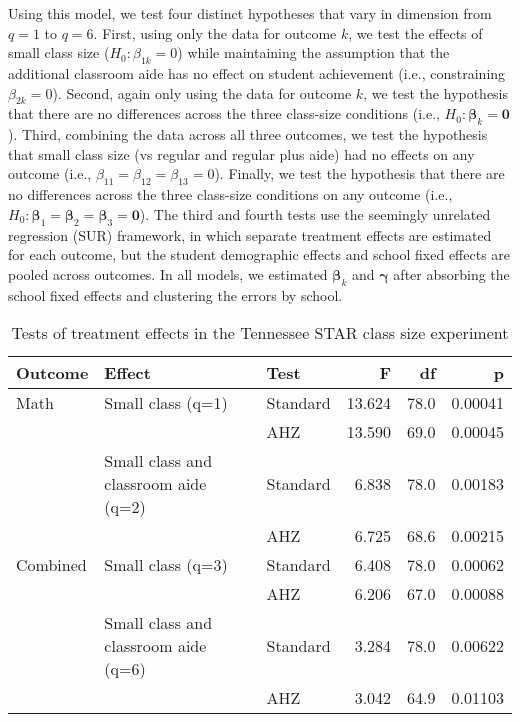 \documentclass[12pt]{article}\usepackage[]{graphicx}\usepackage[]{color}
\newcommand{\bm}{\mathbf}
\newcommand{\bs}{\boldsymbol}
\begin{document}
Using this model, we test four distinct hypotheses that vary in dimension from $q = 1$ to $q = 6$. 
First, using only the data for outcome $k$, we test the effects of small class size ($H_0: \beta_{1k} = 0$) while maintaining the assumption that the additional classroom aide has no effect on student achievement (i.e., constraining $\beta_{2k} = 0$). 
Second, again only using the data for outcome $k$, we test the hypothesis that there are no differences across the three class-size conditions (i.e., $H_0: \bs\beta_k = \bm{0}$). 
Third, combining the data across all three outcomes, we test the hypothesis that small class size (vs regular and regular plus aide) had no effects on any outcome (i.e., $\beta_{11} = \beta_{12} = \beta_{13} = 0$).
Finally, we test the hypothesis that there are no differences across the three class-size conditions on any outcome (i.e., $H_0: \bs\beta_1 = \bs\beta_2 = \bs\beta_3 = \bm{0}$). 
The third and fourth tests use the seemingly unrelated regression (SUR) framework, in which separate treatment effects are estimated for each outcome, but the student demographic effects and school fixed effects are pooled across outcomes. 
In all models, we estimated $\bs\beta_k$ and $\bs\gamma$ after absorbing the school fixed effects and clustering the errors by school.



\begin{table}[tbh]
\centering
\begin{tabular}{lllrrr}
  \toprule
Outcome & Effect & Test & F & df & p \\ 
  \midrule
Math & Small class (q=1) & Standard & 13.624 & 78.0 & 0.00041 \\ 
   &  & AHZ & 13.590 & 69.0 & 0.00045 \\ 
   & Small class and classroom aide (q=2) & Standard & 6.838 & 78.0 & 0.00183 \\ 
   &  & AHZ & 6.725 & 68.6 & 0.00215 \\ 
   \midrule
Combined & Small class (q=3) & Standard & 6.408 & 78.0 & 0.00062 \\ 
   &  & AHZ & 6.206 & 67.0 & 0.00088 \\ 
   & Small class and classroom aide (q=6) & Standard & 3.284 & 78.0 & 0.00622 \\ 
   &  & AHZ & 3.042 & 64.9 & 0.01103 \\ 
   \bottomrule
\end{tabular}
\caption{Tests of treatment effects in the Tennessee STAR class size experiment} 
\label{tab:STAR}
\end{table}
\end{document}
